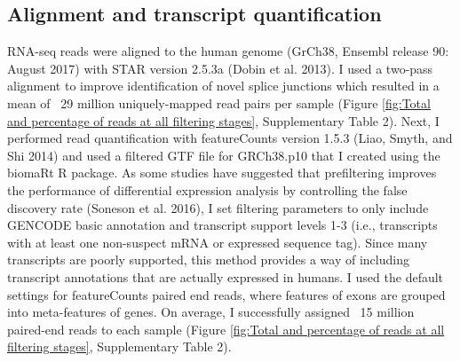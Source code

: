 \documentclass[12pt,a4paper,titlepage,twoside,openright]{book}
\begin{document}
\begin{mainmatter}
\section{Alignment and transcript quantification}
RNA-seq reads were aligned to the human genome (GrCh38, Ensembl release 90: August 2017) with STAR version 2.5.3a (Dobin et al. 2013). I used a two-pass alignment to improve identification of novel splice junctions which resulted in a mean of ~29 million uniquely-mapped read pairs per sample (Figure \ref{fig:Total and percentage of reads at all filtering stages}, Supplementary Table 2). Next, I performed read quantification with featureCounts version 1.5.3 (Liao, Smyth, and Shi 2014) and used a filtered GTF file for GRCh38.p10 that I created using the biomaRt R package. As some studies have suggested that prefiltering improves the performance of differential expression analysis by controlling the false discovery rate (Soneson et al. 2016), I set filtering parameters to only include GENCODE basic annotation and transcript support levels 1-3 (i.e., transcripts with at least one non-suspect mRNA or expressed sequence tag). Since many transcripts are poorly supported, this method provides a way of including transcript annotations that are actually expressed in humans. I used the default settings for featureCounts paired end reads, where features of exons are grouped into meta-features of genes. On average, I successfully assigned ~15 million paired-end reads to each sample (Figure \ref{fig:Total and percentage of reads at all filtering stages}, Supplementary Table 2). 


\end{mainmatter}
\end{document}
